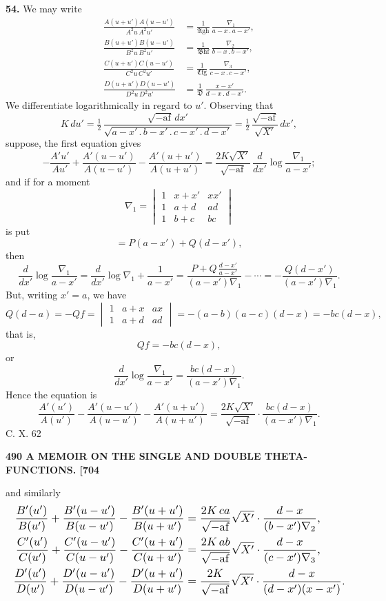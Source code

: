 \documentclass[11pt]{article}
\newcommand{\Ag}{\mathfrak{A}}
\newcommand{\Bg}{\mathfrak{B}}
\newcommand{\Cg}{\mathfrak{C}}
\newcommand{\Dg}{\mathfrak{D}}
\begin{document}
\textbf{54.} We may write
\[
\begin{aligned}
\frac{A(u+u')A(u-u')}{A^2 u\,A^2 u'} &= \frac{1}{\Ag\mathrm{g}\mathrm{h}}\,\frac{\nabla_1}{a-x\,.\,a-x'},\\
\frac{B(u+u')B(u-u')}{B^2 u\,B^2 u'} &= \frac{1}{\Bg\mathrm{h}\mathrm{f}}\,\frac{\nabla_2}{b-x\,.\,b-x'},\\
\frac{C(u+u')C(u-u')}{C^2 u\,C^2 u'} &= \frac{1}{\Cg\mathrm{f}\mathrm{g}}\,\frac{\nabla_3}{c-x\,.\,c-x'},\\
\frac{D(u+u')D(u-u')}{D^2 u\,D^2 u'} &= \frac{1}{\Dg}\,\frac{x-x'}{d-x\,.\,d-x'}.
\end{aligned}
\]
We differentiate logarithmically in regard to $u'$. Observing that
\[
K\,du' = \tfrac{1}{2}\,\frac{\sqrt{-\mathrm{a}\mathrm{f}}\,dx'}{\sqrt{a-x'\,.\,b-x'\,.\,c-x'\,.\,d-x'}} = \tfrac{1}{2}\,\frac{\sqrt{-\mathrm{a}\mathrm{f}}}{\sqrt{X'}}\,dx',
\]
suppose, the first equation gives
\[
-\frac{A'u'}{Au'} + \frac{A'(u-u')}{A(u-u')} - \frac{A'(u+u')}{A(u+u')} = \frac{2K\sqrt{X'}}{\sqrt{-\mathrm{a}\mathrm{f}}}\,\frac{d}{dx'}\log\frac{\nabla_1}{a-x'};
\]
and if for a moment
\[
\nabla_1 = \begin{vmatrix} 1 & x+x' & xx'\\ 1 & a+d & ad\\ 1 & b+c & bc \end{vmatrix}
\]
is put
\[
= P(a-x') + Q(d-x'),
\]
then
\[
\frac{d}{dx'}\log\frac{\nabla_1}{a-x'} = \frac{d}{dx'}\log\nabla_1 + \frac{1}{a-x'} = \frac{P + Q\,\frac{d-x'}{a-x'}}{(a-x')\nabla_1} - \cdots = -\frac{Q(d-x')}{(a-x')\nabla_1}.
\]
But, writing $x'=a$, we have
\[
Q(d-a) = -Qf = \begin{vmatrix} 1 & a+x & ax\\ 1 & a+d & ad \end{vmatrix} = -(a-b)(a-c)(d-x) = -bc(d-x),
\]
that is,
\[
Qf = -bc(d-x),
\]
or
\[
\frac{d}{dx'}\log\frac{\nabla_1}{a-x'} = \frac{bc(d-x)}{(a-x')\nabla_1}.
\]
Hence the equation is
\[
\frac{A'(u')}{A(u')} - \frac{A'(u-u')}{A(u-u')} - \frac{A'(u+u')}{A(u+u')} = \frac{2K\sqrt{X'}}{\sqrt{-\mathrm{a}\mathrm{f}}}\cdot\frac{bc(d-x)}{(a-x')\nabla_1}.
\]
\hfill C. X. \hfill 62

\bigskip
\noindent\textbf{490 \hfill A MEMOIR ON THE SINGLE AND DOUBLE THETA-FUNCTIONS. \hfill [704}

\medskip
and similarly
\[
\resizebox{\textwidth}{!}{$\displaystyle
\begin{aligned}
\frac{B'(u')}{B(u')} + \frac{B'(u-u')}{B(u-u')} - \frac{B'(u+u')}{B(u+u')} &= \frac{2K\,ca}{\sqrt{-\mathrm{a}\mathrm{f}}}\sqrt{X'}\cdot\frac{d-x}{(b-x')\nabla_2},\\
\frac{C'(u')}{C(u')} + \frac{C'(u-u')}{C(u-u')} - \frac{C'(u+u')}{C(u+u')} &= \frac{2K\,ab}{\sqrt{-\mathrm{a}\mathrm{f}}}\sqrt{X'}\cdot\frac{d-x}{(c-x')\nabla_3},\\
\frac{D'(u')}{D(u')} + \frac{D'(u-u')}{D(u-u')} - \frac{D'(u+u')}{D(u+u')} &= \frac{2K}{\sqrt{-\mathrm{a}\mathrm{f}}}\sqrt{X'}\cdot\frac{d-x}{(d-x')(x-x')}.
\end{aligned}$}
\]
\end{document}
